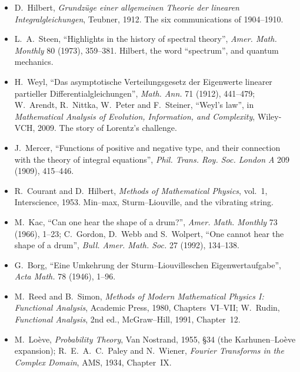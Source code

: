 \begin{itemize}
\item D.~Hilbert, \emph{Grundz\"uge einer allgemeinen Theorie der linearen Integralgleichungen}, Teubner, 1912. The six communications of 1904--1910.
\item L.~A.~Steen, ``Highlights in the history of spectral theory'', \emph{Amer. Math. Monthly} 80 (1973), 359--381. Hilbert, the word ``spectrum'', and quantum mechanics.
\item H.~Weyl, ``Das asymptotische Verteilungsgesetz der Eigenwerte linearer partieller Differentialgleichungen'', \emph{Math. Ann.} 71 (1912), 441--479; W.~Arendt, R.~Nittka, W.~Peter and F.~Steiner, ``Weyl's law'', in
\emph{Mathematical Analysis of Evolution, Information, and Complexity}, Wiley-VCH, 2009. The story of Lorentz's challenge.
\item J.~Mercer, ``Functions of positive and negative type, and their connection with the theory of integral equations'', \emph{Phil. Trans. Roy. Soc. London A} 209 (1909), 415--446.
\item R.~Courant and D.~Hilbert, \emph{Methods of Mathematical Physics}, vol.~1, Interscience, 1953. Min--max, Sturm--Liouville, and the vibrating string.
\item M.~Kac, ``Can one hear the shape of a drum?'', \emph{Amer. Math. Monthly} 73 (1966), 1--23; C.~Gordon, D.~Webb and S.~Wolpert, ``One cannot hear the shape of a drum'', \emph{Bull. Amer. Math. Soc.} 27 (1992), 134--138.
\item G.~Borg, ``Eine Umkehrung der Sturm--Liouvilleschen Eigenwertaufgabe'', \emph{Acta Math.} 78 (1946), 1--96.
\item M.~Reed and B.~Simon, \emph{Methods of Modern Mathematical Physics I: Functional Analysis}, Academic Press, 1980, Chapters~VI--VII; W.~Rudin, \emph{Functional Analysis}, 2nd ed., McGraw--Hill, 1991, Chapter~12.
\item M.~Lo\`eve, \emph{Probability Theory}, Van Nostrand, 1955, \S34 (the Karhunen--Lo\`eve expansion); R.~E.~A.~C.~Paley and N.~Wiener, \emph{Fourier Transforms in the Complex Domain}, AMS, 1934, Chapter~IX.
\end{itemize}
